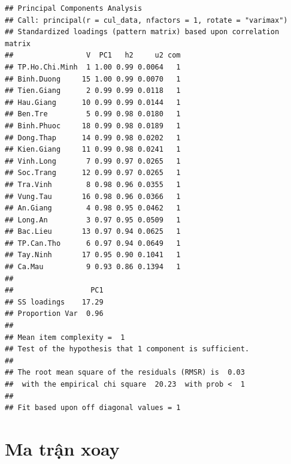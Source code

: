 \documentclass[../thesis.tex]{subfiles}
\begin{document}
\begin{verbatim}
## Principal Components Analysis
## Call: principal(r = cul_data, nfactors = 1, rotate = "varimax")
## Standardized loadings (pattern matrix) based upon correlation matrix
##                 V  PC1   h2     u2 com
## TP.Ho.Chi.Minh  1 1.00 0.99 0.0064   1
## Binh.Duong     15 1.00 0.99 0.0070   1
## Tien.Giang      2 0.99 0.99 0.0118   1
## Hau.Giang      10 0.99 0.99 0.0144   1
## Ben.Tre         5 0.99 0.98 0.0180   1
## Binh.Phuoc     18 0.99 0.98 0.0189   1
## Dong.Thap      14 0.99 0.98 0.0202   1
## Kien.Giang     11 0.99 0.98 0.0241   1
## Vinh.Long       7 0.99 0.97 0.0265   1
## Soc.Trang      12 0.99 0.97 0.0265   1
## Tra.Vinh        8 0.98 0.96 0.0355   1
## Vung.Tau       16 0.98 0.96 0.0366   1
## An.Giang        4 0.98 0.95 0.0462   1
## Long.An         3 0.97 0.95 0.0509   1
## Bac.Lieu       13 0.97 0.94 0.0625   1
## TP.Can.Tho      6 0.97 0.94 0.0649   1
## Tay.Ninh       17 0.95 0.90 0.1041   1
## Ca.Mau          9 0.93 0.86 0.1394   1
## 
##                  PC1
## SS loadings    17.29
## Proportion Var  0.96
## 
## Mean item complexity =  1
## Test of the hypothesis that 1 component is sufficient.
## 
## The root mean square of the residuals (RMSR) is  0.03 
##  with the empirical chi square  20.23  with prob <  1 
## 
## Fit based upon off diagonal values = 1
\end{verbatim}

\newpage

\section{Ma trận xoay}

\begin{Shaded}
	\begin{Highlighting}[]
\OtherTok{\textless{}{-}}\SpecialCharTok{\%\textgreater{}\%} \NormalTok{(}\SpecialCharTok{{-}}\SpecialCharTok{\%\textgreater{}\%}
	\NormalTok{, }
		 \NormalTok{)}		
\OtherTok{\textless{}{-}}\SpecialCharTok{\%\textgreater{}\%} \NormalTok{, }
		 \NormalTok{)}
\SpecialCharTok{$}
\SpecialCharTok{$}
	\end{Highlighting}
\end{Shaded}
\end{document}

